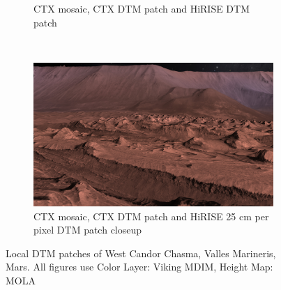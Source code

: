 \begin{figure}[h]
\begin{subfigure}[t]{0.45\textwidth}
        \caption{CTX mosaic, CTX DTM patch and HiRISE DTM patch}
    \end{subfigure}
    ~
    \begin{subfigure}[t]{0.90\textwidth}
        \includegraphics[width=\textwidth]{figures/results/screenshots_thesis_old/west_candor_chasma3.jpg}
        \caption{CTX mosaic, CTX DTM patch and HiRISE 25 cm per pixel DTM patch closeup}
    \end{subfigure}
    \caption{Local DTM patches of West Candor Chasma, Valles Marineris, Mars. All figures use Color Layer: Viking MDIM, Height Map: MOLA}
    \label{fig:localpatches}
\end{figure}


\clearpage
